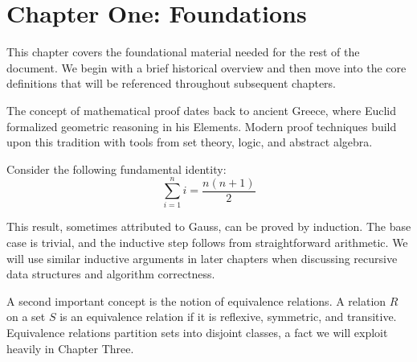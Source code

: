 \section{Chapter One: Foundations}

This chapter covers the foundational material needed for the rest of the document.
We begin with a brief historical overview and then move into the core definitions
that will be referenced throughout subsequent chapters.

The concept of mathematical proof dates back to ancient Greece, where Euclid
formalized geometric reasoning in his Elements. Modern proof techniques build
upon this tradition with tools from set theory, logic, and abstract algebra.

Consider the following fundamental identity:
$$\sum_{i=1}^{n} i = \frac{n(n+1)}{2}$$

This result, sometimes attributed to Gauss, can be proved by induction. The base
case is trivial, and the inductive step follows from straightforward arithmetic.
We will use similar inductive arguments in later chapters when discussing
recursive data structures and algorithm correctness.

A second important concept is the notion of equivalence relations. A relation
$R$ on a set $S$ is an equivalence relation if it is reflexive, symmetric, and
transitive. Equivalence relations partition sets into disjoint classes, a fact
we will exploit heavily in Chapter Three.
